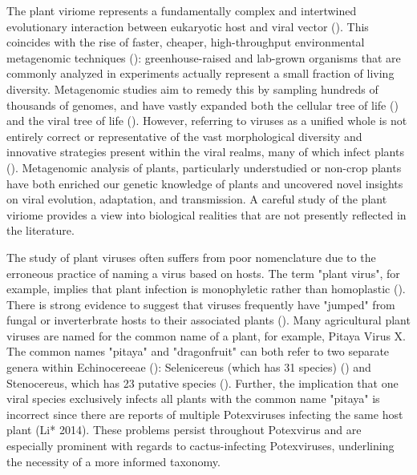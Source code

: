 \documentclass[11pt,letterpaper,titlepage]{article}
\begin{document}
\begin{linenumbers}
The plant viriome represents a fundamentally complex and intertwined evolutionary interaction between eukaryotic host and viral vector (\cite{delwart_viral_2007}).
 This coincides with the rise of faster, cheaper, high-throughput environmental metagenomic techniques (\cite{delwart_viral_2007, lefeuvre_evolution_2019, schulz_towards_2017}): greenhouse-raised and lab-grown organisms that are commonly analyzed in experiments actually represent a small fraction of living diversity. 
 Metagenomic studies aim to remedy this by sampling hundreds of thousands of genomes, and have vastly expanded both the cellular tree of life (\cite{schulz_towards_2017, hug_new_2016}) and the viral tree of life (\cite{gregory_marine_2019, lefeuvre_evolution_2019, shi_redefining_2016}).  
However, referring to viruses as a unified whole is not entirely correct or representative of the vast morphological diversity and innovative strategies present within the viral realms, many of which infect plants (\cite{delwart_viral_2007, lefeuvre_evolution_2019}).
 Metagenomic analysis of plants, particularly understudied or non-crop plants have both enriched our genetic knowledge of plants and uncovered novel insights on viral evolution, adaptation, and transmission. 
 A careful study of the plant viriome provides a view into biological realities that are not presently reflected in the literature.


The study of plant viruses often suffers from poor nomenclature due to the erroneous practice of naming a virus based on hosts. 
The term "plant virus", for example, implies that plant infection is monophyletic rather than homoplastic (\cite{lefeuvre_evolution_2019}). 
There is strong evidence to suggest that viruses frequently have "jumped" from fungal or inverterbrate hosts to their associated plants (\cite{lefeuvre_evolution_2019}). 
Many agricultural plant viruses are named for the common name of a plant, for example, Pitaya Virus X. 
The common names "pitaya" and "dragonfruit" can both refer to two separate genera within Echinocereeae (\cite{le_bellec_12_2011}): Selenicereus (which has 31 species) (\cite{korotkova_phylogenetic_2017, guerrero_phylogenetic_2019}) and Stenocereus, which has 23 putative species (\cite{guerrero_phylogenetic_2019}).
Further, the implication that one viral species exclusively infects all plants with the common name "pitaya" is incorrect since there are reports of multiple Potexviruses infecting the same host plant (Li* 2014). 
These problems persist throughout Potexvirus and are especially prominent with regards to cactus-infecting Potexviruses, underlining the necessity of a more informed taxonomy.



\end{linenumbers}
\end{document}
